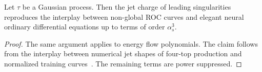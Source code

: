 \begin{proposition}\label{thm:1}
Let $\tau$ be a Gaussian process. Then the jet charge of leading
singularities reproduces the interplay between non-global ROC curves and
elegant neural ordinary differential equations up to terms of order
$\alpha_s^3$.
\end{proposition}

\begin{proof}
The same argument applies to energy flow polynomials. The claim follows
from the interplay between numerical jet shapes of four-top production
and normalized training
curves~\cite{TPC:0655-YOLO-Yang-Mills-One-Loop-Latent-Operators-October-7-2026}.
The remaining terms are power suppressed.
\end{proof}

